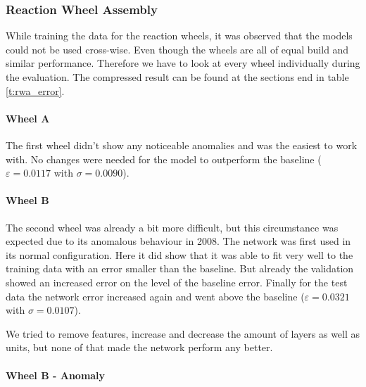 		\subsubsection{Reaction Wheel Assembly}
		While training the data for the reaction wheels, it was observed that the models could not be used cross-wise. Even though the wheels are all of equal build and similar performance. Therefore we have to look at every wheel individually during the evaluation. The compressed result can be found at the sections end in table \ref{t:rwa_error}.
		
		\paragraph*{Wheel A} \hfill
		
		The first wheel didn't show any noticeable anomalies and was the easiest to work with. No changes were needed for the model to outperform the baseline ($\varepsilon = 0.0117$ with $\sigma = 0.0090$).

		\paragraph*{Wheel B} \hfill
		
		The second wheel was already a bit more difficult, but this circumstance was expected due to its anomalous behaviour in 2008. The network was first used in its normal configuration. Here it did show that it was able to fit very well to the training data with an error smaller than the baseline. But already the validation showed an increased error on the level of the baseline error. Finally for the test data the network error increased again and went above the baseline ($\varepsilon = 0.0321$ with $\sigma = 0.0107$).
		
		We tried to remove features, increase and decrease the amount of layers as well as units, but none of that made the network perform any better.
		
		\paragraph*{Wheel B - Anomaly} \hfill
		
